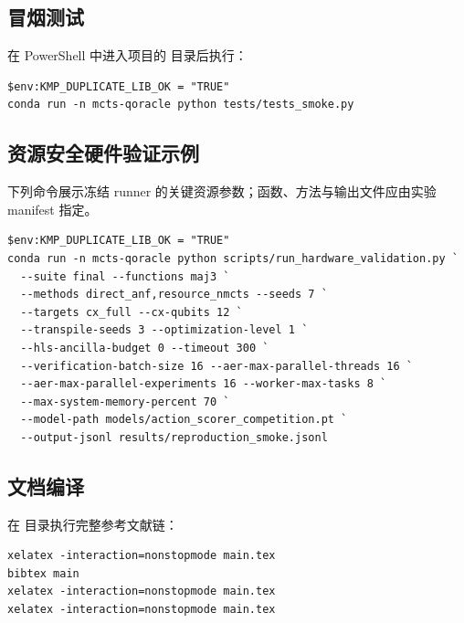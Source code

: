 \documentclass[UTF8,a4paper,12pt]{ctexart}
\begin{document}
\subsection{冒烟测试}

在 PowerShell 中进入项目的  目录后执行：

\begin{lstlisting}
$env:KMP_DUPLICATE_LIB_OK = "TRUE"
conda run -n mcts-qoracle python tests/tests_smoke.py
\end{lstlisting}

\subsection{资源安全硬件验证示例}

下列命令展示冻结 runner 的关键资源参数；函数、方法与输出文件应由实验 manifest 指定。

\begin{lstlisting}[basicstyle=\ttfamily\scriptsize]
$env:KMP_DUPLICATE_LIB_OK = "TRUE"
conda run -n mcts-qoracle python scripts/run_hardware_validation.py `
  --suite final --functions maj3 `
  --methods direct_anf,resource_nmcts --seeds 7 `
  --targets cx_full --cx-qubits 12 `
  --transpile-seeds 3 --optimization-level 1 `
  --hls-ancilla-budget 0 --timeout 300 `
  --verification-batch-size 16 --aer-max-parallel-threads 16 `
  --aer-max-parallel-experiments 16 --worker-max-tasks 8 `
  --max-system-memory-percent 70 `
  --model-path models/action_scorer_competition.pt `
  --output-jsonl results/reproduction_smoke.jsonl
\end{lstlisting}

\subsection{文档编译}

在  目录执行完整参考文献链：

\begin{lstlisting}
xelatex -interaction=nonstopmode main.tex
bibtex main
xelatex -interaction=nonstopmode main.tex
xelatex -interaction=nonstopmode main.tex
\end{lstlisting}

\begingroup
\footnotesize
\setlength{\bibsep}{1.5pt plus 0.2ex}


\endgroup
\end{document}
